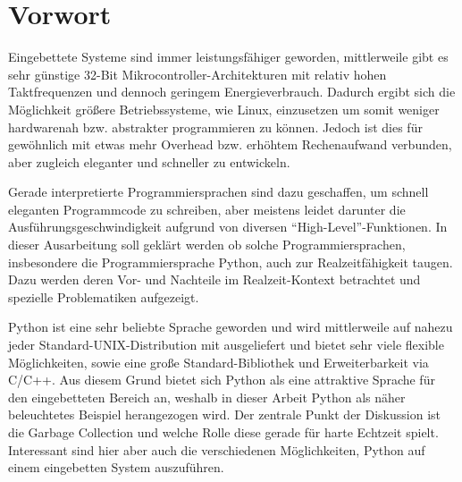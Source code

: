 \section{Vorwort}

Eingebettete Systeme sind immer leistungsfähiger geworden, mittlerweile gibt
es sehr günstige 32-Bit Mikrocontroller-Architekturen mit relativ hohen
Taktfrequenzen und dennoch geringem Energieverbrauch. Dadurch ergibt sich die
Möglichkeit größere Betriebssysteme, wie Linux, einzusetzen um somit weniger
hardwarenah bzw. abstrakter programmieren zu können. Jedoch ist dies für
gewöhnlich mit etwas mehr Overhead bzw. erhöhtem Rechenaufwand verbunden,
aber zugleich eleganter und schneller zu entwickeln.

Gerade interpretierte Programmiersprachen sind dazu geschaffen, um schnell
eleganten Programmcode zu schreiben, aber meistens leidet darunter die
Aus\-führ\-ungs\-gesch\-windig\-keit aufgrund von diversen “High-Level”-Funktionen. In
dieser Ausarbeitung soll geklärt werden ob solche Programmiersprachen,
insbesondere die Programmiersprache Python, auch zur Realzeitfähigkeit taugen.
Dazu werden deren Vor- und Nachteile im Realzeit-Kontext betrachtet und
spezielle Problematiken aufgezeigt.


Python ist eine sehr beliebte Sprache geworden und wird mittlerweile auf
nahezu jeder Standard-UNIX-Distribution mit ausgeliefert und bietet sehr
viele flexible Möglichkeiten, sowie eine große Standard-Bibliothek und
Erweiterbarkeit via C/C++. Aus diesem Grund bietet sich Python als eine
attraktive Sprache für den eingebetteten Bereich an, weshalb in dieser Arbeit
Python als näher beleuchtetes Beispiel herangezogen wird. Der zentrale Punkt
der Diskussion ist die Garbage Collection und welche Rolle diese gerade für
harte Echtzeit spielt.
Interessant sind hier aber auch die verschiedenen Möglichkeiten, Python auf
einem eingebetten System auszuführen.
